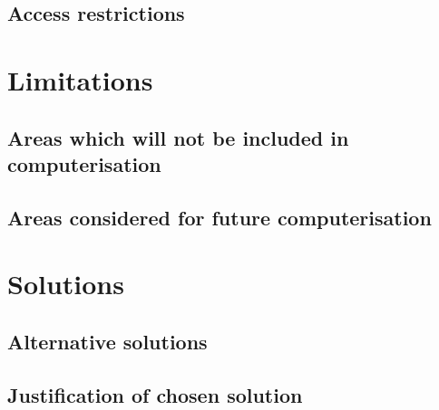 \documentclass{article}
\begin{document}
	\subsection{Access restrictions}

\section{Limitations}

	\subsection{Areas which will not be included in computerisation}

	\subsection{Areas considered for future computerisation}

\section{Solutions}

	\subsection{Alternative solutions}

	\subsection{Justification of chosen solution}
\end{document}
